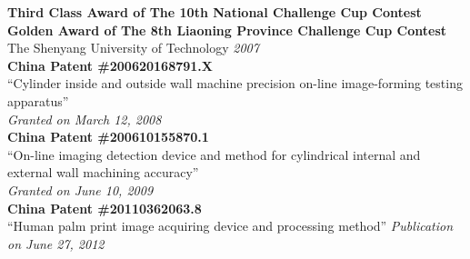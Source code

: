 \documentclass[9pt]{article}
\newenvironment{changemargin}[2]{%
  \begin{list}{}{%
    \setlength{\topsep}{0pt}%
    \setlength{\leftmargin}{#1}%
    \setlength{\rightmargin}{#2}%
    \setlength{\listparindent}{\parindent}%
    \setlength{\itemindent}{\parindent}%
    \setlength{\parsep}{\parskip}%
  }%
  \item[]}{\end{list}
}
\newenvironment{body} {
	\vspace*{-16pt}
	\begin{changemargin}{-0.25in}{-0.5in}
  }	
	{\end{changemargin}
}
\begin{document}
\begin{body}
	\vspace{14pt}	
    \textbf{Third Class Award of The 10th National Challenge Cup Contest\\
    Golden Award of The 8th Liaoning Province Challenge Cup Contest}\\
    The Shenyang University of Technology \hfill{} \emph{2007}\\
    \medskip
    \textbf{China Patent \#200620168791.X}\\
    ``Cylinder inside and outside wall machine precision on-line image-forming testing apparatus''\\
    \hfill{} \emph{Granted on March 12, 2008}\\
    \medskip	
    \textbf{China Patent \#200610155870.1}\\
    ``On-line imaging detection device and method for cylindrical internal and external wall machining accuracy''\\
    \hfill{} \emph{Granted on June 10, 2009}\\
    \medskip    
    \textbf{China Patent \#20110362063.8}\\
    ``Human palm print image acquiring device and processing method'' \hfill{} \emph{Publication on June 27, 2012}
\end{body}
\end{document}
